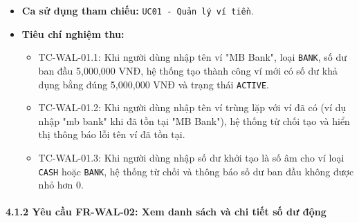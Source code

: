 \documentclass[11pt,a4paper]{article}
\providecommand{\tightlist}{
  \setlength{\itemsep}{0pt}\setlength{\parskip}{0pt}}
\begin{document}
\begin{itemize}
  \begin{itemize}
  \tightlist
  \item
    Đối tượng ví (\texttt{Wallet}) mới được lưu thành công vào cơ sở dữ
    liệu kèm mã định danh duy nhất (\texttt{walletId}).
  \item
    Thông báo tạo ví thành công hiển thị cho người dùng.
  \end{itemize}
\item
  \textbf{Ca sử dụng tham chiếu:} \texttt{UC01\ -\ Quản\ lý\ ví\ tiền}.
\item
  \textbf{Tiêu chí nghiệm thu:}

  \begin{itemize}
  \tightlist
  \item
    TC-WAL-01.1: Khi người dùng nhập tên ví "MB Bank", loại
    \texttt{BANK}, số dư ban đầu 5,000,000 VNĐ, hệ thống tạo thành công
    ví mới có số dư khả dụng bằng đúng 5,000,000 VNĐ và trạng thái
    \texttt{ACTIVE}.
  \item
    TC-WAL-01.2: Khi người dùng nhập tên ví trùng lặp với ví đã có (ví
    dụ nhập "mb bank" khi đã tồn tại "MB Bank"), hệ thống từ chối tạo và
    hiển thị thông báo lỗi tên ví đã tồn tại.
  \item
    TC-WAL-01.3: Khi người dùng nhập số dư khởi tạo là số âm cho ví loại
    \texttt{CASH} hoặc \texttt{BANK}, hệ thống từ chối và thông báo số
    dư ban đầu không được nhỏ hơn 0.
  \end{itemize}
\end{itemize}

\paragraph{4.1.2 Yêu cầu FR-WAL-02: Xem danh sách và chi tiết số dư
động}\label{412-yuxeau-cux1ea7u-fr-wal-02-xem-danh-suxe1ch-vuxe0-chi-tiux1ebft-sux1ed1-dux1b0-ux111ux1ed9ng}
\end{document}
